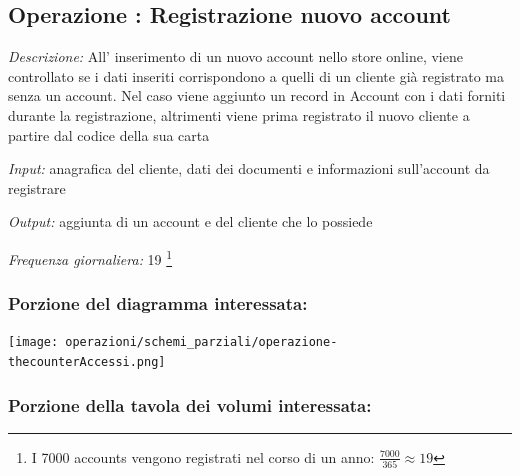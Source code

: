 \documentclass[12pt,a4paper]{article}
\begin{document}

\subsection*{Operazione \thecounterAccessi{}: Registrazione nuovo account}
\noindent\textit{Descrizione:} All' inserimento di un nuovo account nello store online, viene controllato se i dati inseriti corrispondono a quelli di un cliente già registrato ma senza un account. Nel caso viene aggiunto un record in Account con i dati forniti durante la registrazione, altrimenti viene prima registrato il nuovo cliente a partire dal codice della sua carta

\noindent\textit{Input:} anagrafica del cliente, dati dei documenti e informazioni sull'account da registrare

\noindent\textit{Output:} aggiunta di un account e del cliente che lo possiede

\noindent\textit{Frequenza giornaliera:} 19 \footnote{I 7000 accounts vengono registrati nel corso di un anno: $\frac{7000}{365}\approx 19$}

\subsubsection*{Porzione del diagramma interessata:}



\texttt{[image: operazioni/schemi\_parziali/operazione-\\thecounterAccessi.png]} 



\subsubsection*{Porzione della tavola dei volumi interessata:}
\end{document}
